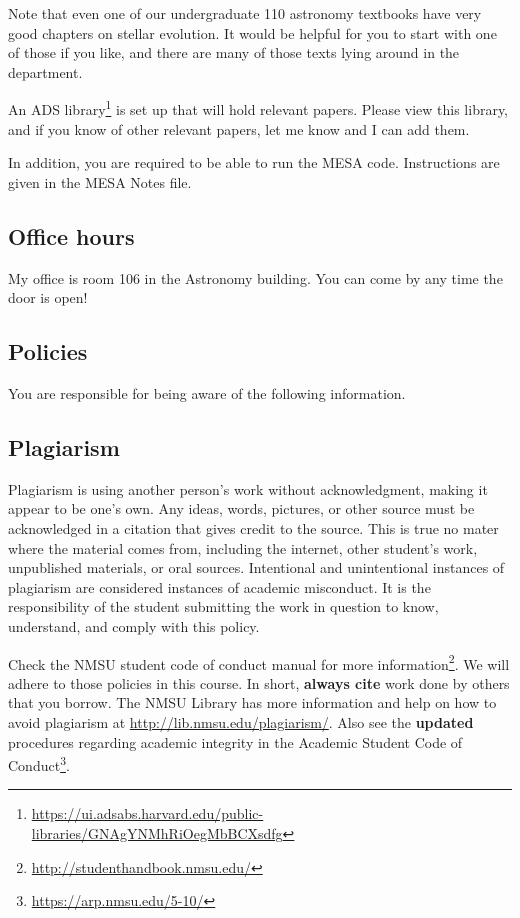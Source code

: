 \documentclass[10pt,letterpaper]{article}
\newcommand{\simplelatexlink}[2]{\href{#2}{#1}}
\begin{document}
 Note that even one of our undergraduate 110 astronomy textbooks have very good chapters on stellar evolution. It would be helpful for you to start with one of those if you like, and there are many of those texts lying around in the department. 

An ADS library\footnote{\url{https://ui.adsabs.harvard.edu/public-libraries/GNAgYNMhRiOegMbBCXsdfg}} is set up that will hold relevant papers. Please view this library, and if you know of other relevant papers, let me know and I can add them.

In addition, you are required to be able to run the MESA code. Instructions are given in the MESA Notes file.


\subsection*{Office hours}

My office is room 106 in the Astronomy building. You can come by any time the door is open!


\subsection*{Policies}

You are responsible for being aware of the following information.

\subsection*{Plagiarism}
Plagiarism is using another person's work without acknowledgment, making it appear to be one's own. Any ideas, words, pictures, or other source must be acknowledged in a citation that gives credit to the source. This is true no mater where the material comes from, including the internet, other student's work, unpublished materials, or oral sources. Intentional and unintentional instances of plagiarism are considered instances of academic misconduct. It is the responsibility of the student submitting the work in question to know, understand, and comply with this policy. 

Check the NMSU student code of conduct  manual for more information\footnote{\url{http://studenthandbook.nmsu.edu/}}. We will adhere to those policies in this course. In short,  {\bf always cite} work done by others that you borrow. The NMSU Library has more information and help on how to avoid plagiarism at \simplelatexlink{http://lib.nmsu.edu/plagiarism/}{http://lib.nmsu.edu/plagiarism/}. Also  see the \textbf{updated} procedures regarding academic integrity in the Academic Student Code of Conduct\footnote{\url{https://arp.nmsu.edu/5-10/}}.
\end{document}
